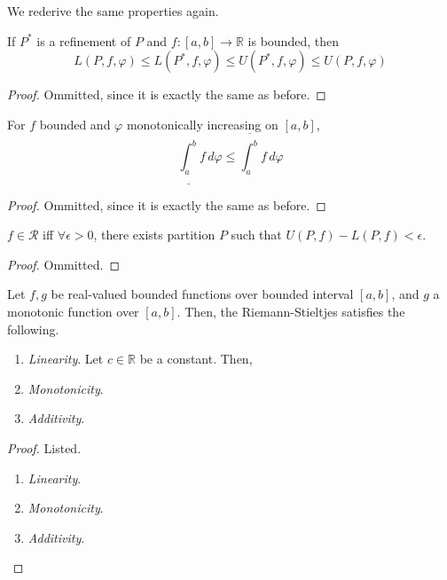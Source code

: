   We rederive the same properties again.   

  \begin{lemma}
    \label{thm:fundamental-lemma-2}
    If $P^\ast$ is a refinement of $P$ and $f: [a, b] \to \mathbb{R}$ is bounded, then 
    \begin{equation}
      L(P, f, \varphi) \leq L(P^\ast, f, \varphi) \leq U(P^\ast, f, \varphi) \leq U(P, f, \varphi) 
    \end{equation}
  \end{lemma}
  \begin{proof}
    Ommitted, since it is exactly the same as before. 
  \end{proof}

  \begin{theorem}
    \label{thm:lower-and-upper-stieltjes-integrals}
    For $f$ bounded and $\varphi$ monotonically increasing on $[a, b]$,
    \begin{equation}
      \underline{\int_{a}^b} f \,d\varphi \leq \overline{\int_{a}^{b}} f \,d\varphi
    \end{equation}
  \end{theorem}
  \begin{proof}
    Ommitted, since it is exactly the same as before. 
  \end{proof}

  \begin{theorem}
    \label{thm:cauchy-riemann-stieltjes-integrability}
    $f \in \mathcal{R}$ iff $\forall \epsilon > 0$, there exists partition $P$ such that $U(P, f) - L(P, f) < \epsilon$. 
  \end{theorem}
  \begin{proof}
    Ommitted. 
  \end{proof}

  \begin{theorem}
    \label{thm:axiomatic-properties-of-riemann-stieltjes}
    Let $f, g$ be real-valued bounded functions over bounded interval $[a, b]$, and $g$ a monotonic function over $[a, b]$. Then, the Riemann-Stieltjes satisfies the following. 
    \begin{enumerate}
      \item \textit{Linearity}. Let $c \in \mathbb{R}$ be a constant. Then, 
      \item \textit{Monotonicity}. 
      \item \textit{Additivity}. 
    \end{enumerate}
  \end{theorem}
  \begin{proof}
    Listed. 
    \begin{enumerate}
      \item \textit{Linearity}.
      \item \textit{Monotonicity}. 
      \item \textit{Additivity}. 
    \end{enumerate}
  \end{proof}

